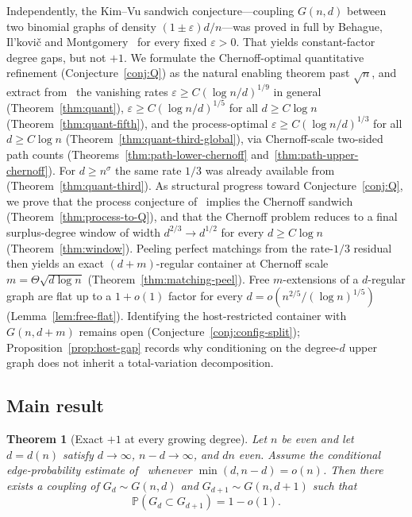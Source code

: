 \documentclass[11pt]{article}
\newtheorem{theorem}{Theorem}
\newcommand{\Gnd}{G(n,d)}
\newcommand{\PP}{\mathbb{P}}
\begin{document}
Independently, the Kim--Vu sandwich conjecture---coupling \(\Gnd\) between two
binomial graphs of density \((1\pm\varepsilon)d/n\)---was proved in full by
Behague, Il'kovi\v{c} and Montgomery~\cite{BIM25} for every fixed \(\varepsilon>0\).
That yields constant-factor degree gaps, but not \(+1\).
We formulate the Chernoff-optimal quantitative refinement
(Conjecture~\ref{conj:Q}) as the natural enabling theorem past \(\sqrt{n}\),
and extract from~\cite{BIM25} the vanishing rates
\(\varepsilon\ge C(\log n/d)^{1/9}\) in general
(Theorem~\ref{thm:quant}), \(\varepsilon\ge C(\log n/d)^{1/5}\) for all
\(d\ge C\log n\) (Theorem~\ref{thm:quant-fifth}), and the process-optimal
\(\varepsilon\ge C(\log n/d)^{1/3}\) for all \(d\ge C\log n\)
(Theorem~\ref{thm:quant-third-global}), via Chernoff-scale two-sided path
counts (Theorems~\ref{thm:path-lower-chernoff} and~\ref{thm:path-upper-chernoff}).
For \(d\ge n^{\sigma}\) the same rate \(1/3\) was already available from
~\cite[Lemma~8.1]{BIM25} (Theorem~\ref{thm:quant-third}).
As structural progress toward Conjecture~\ref{conj:Q}, we prove that the process
conjecture of~\cite{BIM25} implies the Chernoff sandwich
(Theorem~\ref{thm:process-to-Q}), and that the Chernoff problem reduces to a
final surplus-degree window of width \(d^{2/3}\to d^{1/2}\) for every
\(d\ge C\log n\) (Theorem~\ref{thm:window}).
Peeling perfect matchings from the rate-\(1/3\) residual then yields an exact
\((d+m)\)-regular container at Chernoff scale \(m=\Theta\sqrt{d\log n}\)
(Theorem~\ref{thm:matching-peel}).
Free \(m\)-extensions of a \(d\)-regular graph are flat up to a \(1+o(1)\) factor
for every \(d=o(n^{2/5}/(\log n)^{1/5})\) (Lemma~\ref{lem:free-flat}).
Identifying the host-restricted container with \(G(n,d+m)\) remains open
(Conjecture~\ref{conj:config-split}); Proposition~\ref{prop:host-gap} records why
conditioning on the degree-\(d\) upper graph does not inherit a total-variation
decomposition.

\subsection{Main result}

\begin{theorem}[Exact \(+1\) at every growing degree]
\label{thm:plus-one}
Let \(n\) be even and let \(d=d(n)\) satisfy \(d\to\infty\), \(n-d\to\infty\), and \(dn\) even.
Assume the conditional edge-probability estimate of~\cite[Theorem~6]{Gao20} whenever \(\min(d,n-d)=o(n)\).
Then there exists a coupling of \(G_d\sim\Gnd\) and \(G_{d+1}\sim G(n,d+1)\) such that
\[
\PP(G_d\subset G_{d+1})=1-o(1).
\]
\end{theorem}
\end{document}
